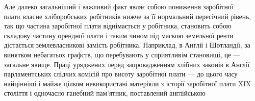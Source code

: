 Але далеко загальніший і важливий факт являє собою пониження заробітної
плати власне хліборобських робітників нижче за її нормальний пересічний
рівень, так що частина заробітної плати віднімається у робітника, становить
собою складову частину орендної плати і таким чином під маскою земельної ренти
дістається землевласникові замість робітника. Наприклад, в Англії і Шотландії,
за винятком небагатьох графств, що перебувають у сприятливім становищі,
це — загальне явище. Праці уряджених перед запровадженням хлібних законів
в Англії парламентських слідчих комісій про висоту заробітної плати — до цього
часу найцінніші і майже цілком невикористані матеріяли з історії заробітної
плати XIX століття і одночасно ганебний пам’ятник, поставлений англійською
\parbreak{}  %
